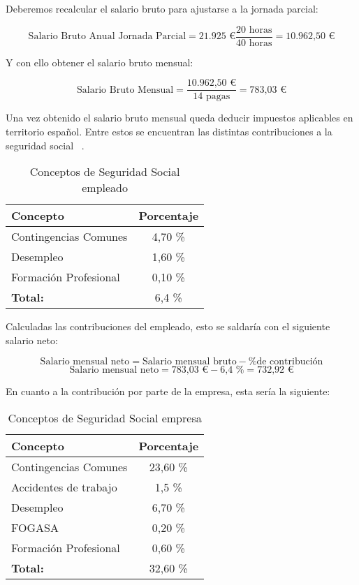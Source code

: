 Deberemos recalcular el salario bruto para ajustarse a la jornada parcial:

\[
\text{Salario Bruto Anual Jornada Parcial} = \text{21.925 €}  \frac{\text{20 horas}}{\text{40 horas}} = \text{10.962,50 €}
\]

Y con ello obtener el salario bruto mensual:

\[
\text{Salario Bruto Mensual} = \frac{\text{10.962,50 €}}{\text{14 pagas}} = \text{783,03 €}
\]

Una vez obtenido el salario bruto mensual queda deducir impuestos aplicables en territorio español. Entre estos se encuentran las distintas contribuciones a la seguridad social ~\cite{segsocialSeguridadSocial}.


\begin{table}[h!]
	\centering
	\begin{tabular}{| l | c |}
		\toprule
		\textbf{Concepto} & \textbf{Porcentaje} \\ \midrule
		Contingencias Comunes & 4,70 \%\\
		Desempleo & 1,60 \% \\
		Formación Profesional & 0,10 \% \\
		\midrule
		\textbf{Total:} & 6,4 \% \\
		\bottomrule
	\end{tabular}
	\caption{Conceptos de Seguridad Social empleado}
	\label{SSemp}
\end{table}

Calculadas las contribuciones del empleado, esto se saldaría con el siguiente salario neto:

\[
\text{Salario mensual neto} = \text{Salario mensual bruto} - \text{\% de contribución}
\]
\[
\text{Salario mensual neto} = \text{783,03 €} - \text{6,4 \%} = \text{732,92 €}
\]

En cuanto a la contribución por parte de la empresa, esta sería la siguiente:

\begin{table}[h!]
	\centering
	\begin{tabular}{| l | c |}
		\toprule
		\textbf{Concepto} & \textbf{Porcentaje} \\ \midrule
		Contingencias Comunes & 23,60 \%\\
		Accidentes de trabajo & 1,5 \%\\
		Desempleo & 6,70 \% \\
		FOGASA & 0,20 \%\\
		Formación Profesional & 0,60 \% \\
		\midrule
		\textbf{Total:} & 32,60 \% \\
		\bottomrule
	\end{tabular}
	\caption{Conceptos de Seguridad Social empresa}
	\label{SSempresa}
\end{table}

